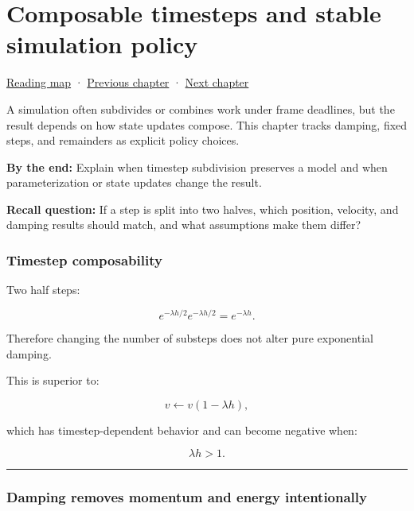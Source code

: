 \chapter{Composable timesteps and stable simulation policy}\label{06-engine-ii-ch039-composable-timesteps-and-stable-simulation-policy}\hypertarget{06-engine-ii-ch039}{}\label{stagechapter:06-engine-ii-ch039}

\hypertarget{06-engine-ii-ch039-composable-timesteps-and-stable-simulation-policy}{}

\hyperref[volume-reading-map]{Reading map} · \hyperref[06-engine-ii-ch038-integrator-choices-and-energy-drift]{Previous chapter} · \hyperref[06-engine-ii-ch040-coupled-contacts-and-iterative-response]{Next chapter}

A simulation often subdivides or combines work under frame deadlines, but the result depends on how state updates compose. This chapter tracks damping, fixed steps, and remainders as explicit policy choices.

\textbf{By the end:} Explain when timestep subdivision preserves a model and when parameterization or state updates change the result.

\textbf{Recall question:} If a step is split into two halves, which position, velocity, and damping results should match, and what assumptions make them differ?

\subsection{Timestep composability}\label{06-engine-ii-ch039-timestep-composability}

\hypertarget{06-engine-ii-ch039-timestep-composability}{}

Two half steps:

\[
e^{-\lambda h/2}
e^{-\lambda h/2}
=
e^{-\lambda h}.
\]

Therefore changing the number of substeps does not alter pure exponential damping.

This is superior to:

\[
v\leftarrow v(1-\lambda h),
\]

which has timestep-dependent behavior and can become negative when:

\[
\lambda h>1.
\]

\begin{center}\rule{0.5\linewidth}{0.5pt}\end{center}

\subsection{Damping removes momentum and energy intentionally}\label{06-engine-ii-ch039-damping-removes-momentum-and-energy-intentionally}

